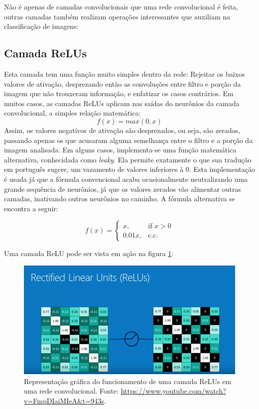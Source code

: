\documentclass[
	12pt,				%
	oneside,			%
	a4paper,			%
	english,			%
	french,				%
	spanish,			%
	brazil,				%
	]{abntex2}
\begin{document}
Não é apenas de camadas convolucionais que uma rede convolucional é feita, outras camadas também realizam operações interessantes que auxiliam na classificação de imagens:

\subsection{Camada ReLUs}
Esta camada tem uma função muito simples dentro da rede: Rejeitar os baixos valores de ativação, desprezando então as convoluções entre filtro e porção da imagem que não trouxeram informação, e enfatizar os casos contrários. Em muitos casos, as camadas ReLUs aplicam nas saídas do neurônios da camada convolucional, a simples relação matemática:
\begin{equation}
	f(x) = max(0,x)
	\label{eq_relus}
\end{equation}
Assim, os valores negativos de ativação são desprezados, ou seja, são zerados, passando apenas os que acusaram alguma semelhança entre o filtro e a porção da imagem analisada. Em alguns casos, implementa-se uma função matemática alternativa, conhecidada como \textit{leaky}. Ela permite exatamente o que sua tradução em português sugere, um vazamento de valores inferiores à \(0\). Esta implementação é usada já que a fórmula convencional acaba ocasionalmente neutralizando uma grande sequência de neurônios, já que os valores zerados vão alimentar outras camadas, inativando outros neurônios no caminho. A fórmula alternativa se encontra a seguir:

\[
f(x)= 
\begin{cases}
x,& \text{if } x > 0  \\      
0.01x,& \text{c.c.}
\end{cases}
\]

Uma camada ReLU pode ser vista em ação na figura \ref{relus}:

\begin{figure}[H]
	\centering
	\includegraphics[width=.8\textwidth]{imagens/relus}
	\caption{Representação gráfica do funcionamento de uma camada ReLUs em uma rede convolucional. Fonte: \href{https://www.youtube.com/watch?v=FmpDIaiMIeA\&t=943s}{https://www.youtube.com/watch?v=FmpDIaiMIeA\&t=943s}.}
	\label{relus}
\end{figure} 
\end{document}
